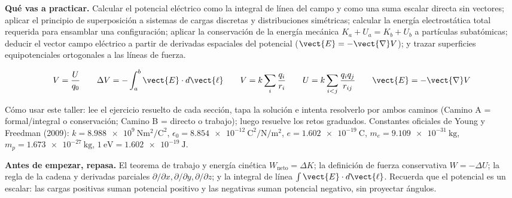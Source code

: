 \documentclass[11pt]{article}
\begin{document}

\textbf{Qué vas a practicar.} Calcular el potencial eléctrico como la integral de línea del campo y como una suma escalar directa sin vectores; aplicar el principio de superposición a sistemas de cargas discretas y distribuciones simétricas; calcular la energía electrostática total requerida para ensamblar una configuración; aplicar la conservación de la energía mecánica $K_a+U_a=K_b+U_b$ a partículas subatómicas; deducir el vector campo eléctrico a partir de derivadas espaciales del potencial ($\vect{E}=-\vect{\nabla}V$); y trazar superficies equipotenciales ortogonales a las líneas de fuerza.

\begin{eFormula}
\vspace{-6pt}\[ V = \frac{U}{q_0}\qquad \Delta V = -\int_{a}^{b}\vect{E}\cdot d\vect{\ell}\qquad V = k\sum_i \frac{q_i}{r_i}\qquad U = k\sum_{i<j}\frac{q_iq_j}{r_{ij}}\qquad \vect{E}=-\vect{\nabla}V \]\vspace{-10pt}
\end{eFormula}

{\small\color{e10muted}Cómo usar este taller: lee el ejercicio resuelto de cada sección, tapa la solución e intenta resolverlo por ambos caminos (Camino A = formal/integral o conservación; Camino B = directo o trabajo); luego resuelve los retos graduados. Constantes oficiales de Young y Freedman (2009): $k=\SI{8,988e9}{\newton\metre\squared\per\coulomb\squared}$, $\epsilon_0=\SI{8,854e-12}{\coulomb\squared\per\newton\per\metre\squared}$, $e=\SI{1,602e-19}{\coulomb}$, $m_e=\SI{9,109e-31}{\kilogram}$, $m_p=\SI{1,673e-27}{\kilogram}$, $\SI{1}{\electronvolt}=\SI{1,602e-19}{\joule}$.}

\begin{eClave}{\sffamily\small\bfseries\color{e10primary}Antes de empezar, repasa.} El teorema de trabajo y energía cinética $W_{\text{neto}}=\Delta K$; la definición de fuerza conservativa $W=-\Delta U$; la regla de la cadena y derivadas parciales $\partial/\partial x, \partial/\partial y, \partial/\partial z$; y la integral de línea $\int \vect{E}\cdot d\vect{\ell}$. Recuerda que el potencial es un escalar: las cargas positivas suman potencial positivo y las negativas suman potencial negativo, sin proyectar ángulos.\end{eClave}

\end{document}
